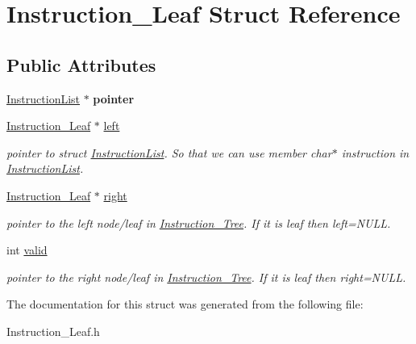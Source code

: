 \hypertarget{structInstruction__Leaf}{
\section{Instruction\_\-Leaf Struct Reference}
\label{structInstruction__Leaf}
}
\subsection*{Public Attributes}
\begin{DoxyCompactItemize}
\item 
\hypertarget{structInstruction__Leaf_a3bdd875389a52faec9a2c22e34587e03}{
\hyperlink{structInstructionList}{InstructionList} $\ast$ {\bfseries pointer}}
\label{structInstruction__Leaf_a3bdd875389a52faec9a2c22e34587e03}

\item 
\hypertarget{structInstruction__Leaf_a6b61ac5226219e5ccd91e341682b53c2}{
\hyperlink{structInstruction__Leaf}{Instruction\_\-Leaf} $\ast$ \hyperlink{structInstruction__Leaf_a6b61ac5226219e5ccd91e341682b53c2}{left}}
\label{structInstruction__Leaf_a6b61ac5226219e5ccd91e341682b53c2}

\begin{DoxyCompactList}\small\item\em pointer to struct \hyperlink{structInstructionList}{InstructionList}. So that we can use member char$\ast$ instruction in \hyperlink{structInstructionList}{InstructionList}. \item\end{DoxyCompactList}\item 
\hypertarget{structInstruction__Leaf_a0aaf651c987a0f4b43a147a0f12aa4af}{
\hyperlink{structInstruction__Leaf}{Instruction\_\-Leaf} $\ast$ \hyperlink{structInstruction__Leaf_a0aaf651c987a0f4b43a147a0f12aa4af}{right}}
\label{structInstruction__Leaf_a0aaf651c987a0f4b43a147a0f12aa4af}

\begin{DoxyCompactList}\small\item\em pointer to the left node/leaf in \hyperlink{classInstruction__Tree}{Instruction\_\-Tree}. If it is leaf then left=NULL. \item\end{DoxyCompactList}\item 
\hypertarget{structInstruction__Leaf_ac32816e6c74234c4bcb8f3442a387bf2}{
int \hyperlink{structInstruction__Leaf_ac32816e6c74234c4bcb8f3442a387bf2}{valid}}
\label{structInstruction__Leaf_ac32816e6c74234c4bcb8f3442a387bf2}

\begin{DoxyCompactList}\small\item\em pointer to the right node/leaf in \hyperlink{classInstruction__Tree}{Instruction\_\-Tree}. If it is leaf then right=NULL. \item\end{DoxyCompactList}\end{DoxyCompactItemize}


The documentation for this struct was generated from the following file:\begin{DoxyCompactItemize}
\item 
Instruction\_\-Leaf.h\end{DoxyCompactItemize}
